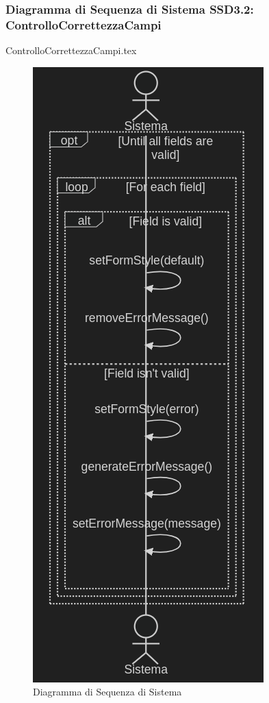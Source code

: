 \documentclass[12pt]{article}
\begin{document}
\subsubsection{Diagramma di Sequenza di Sistema SSD3.2: ControlloCorrettezzaCampi}

{ControlloCorrettezzaCampi.tex}

\begin{figure}[H]
    \includegraphics[width=\textwidth, height=0.5\textheight,keepaspectratio]{Immagini/SSD/Iterazione 1/SSDControlloCorrettezzaCampi.png}
        \caption{Diagramma di Sequenza di Sistema}
        \label{fig:diagrammaSSD3.2}
\end{figure}
\end{document}
